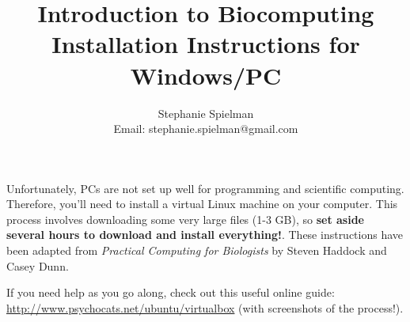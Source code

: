 \documentclass{article}
\begin{document}
\title{Introduction to Biocomputing \\ Installation Instructions for Windows/PC}
\author{Stephanie Spielman \\ \footnotesize{Email: stephanie.spielman@gmail.com}}
\date{}
\maketitle{}

Unfortunately, PCs are not set up well for programming and scientific computing. Therefore, you'll need to install a virtual Linux machine on your computer. This process involves downloading some very large files (1-3 GB), so \textbf{set aside several hours to download and install everything!}. These instructions have been adapted from \emph{Practical Computing for Biologists} by Steven Haddock and Casey Dunn.

If you need help as you go along, check out this useful online guide: \\ \href{http://www.psychocats.net/ubuntu/virtualbox}{http://www.psychocats.net/ubuntu/virtualbox} (with screenshots of the process!).
\end{document}
